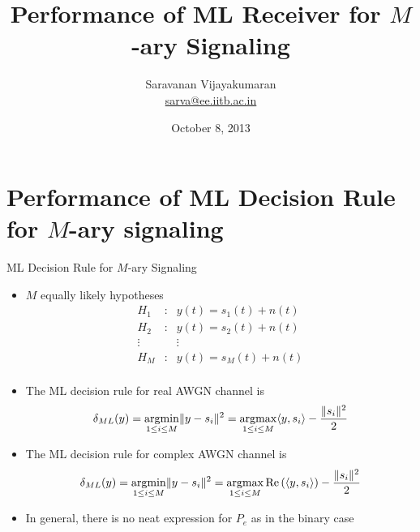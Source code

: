 \documentclass[t]{beamer}
\title[EE 703 DMT]{Performance of ML Receiver for $M$-ary Signaling}
\author[Saravanan V]
{
  Saravanan Vijayakumaran\\
  \href{mailto:sarva@ee.iitb.ac.in}{sarva@ee.iitb.ac.in}
}
\institute[IIT Bombay]
{
  Department of Electrical Engineering\\
  Indian Institute of Technology Bombay
}
\date{October 8, 2013}
\newcommand{\argmax}{\operatornamewithlimits{argmax}}
\newcommand{\argmin}{\operatornamewithlimits{argmin}}
\renewcommand\Re{\operatorname{Re}}
\begin{document}
\begin{frame}
  \titlepage
\end{frame}

\section{Performance of ML Decision Rule for $M$-ary signaling}
\begin{frame}{ML Decision Rule for $M$-ary Signaling}
  \footnotesize
  \begin{itemize}
    \item \pause $M$ equally likely hypotheses
      \begin{equation*}
        \begin{array}{ccc}
            H_1 & : & y(t) = s_1(t) + n(t) \\
            H_2 & : & y(t) = s_2(t) + n(t) \\
            \vdots &   &  \vdots          \\
            H_M & : & y(t) = s_M(t) + n(t) \\
        \end{array}
      \end{equation*}
    \item \pause The ML decision rule for real AWGN channel is
      \begin{eqnarray*}
        \delta_{ML}(y) = \argmin_{1 \leq i \leq M} \lVert y - s_i \rVert^2 = \argmax_{1 \leq i \leq M} \langle y, s_i \rangle - \frac{\lVert s_i \rVert^2}{2}
      \end{eqnarray*}
    \item \pause The ML decision rule for complex AWGN channel is
      \begin{eqnarray*}
        \delta_{ML}(y) = \argmin_{1 \leq i \leq M} \lVert y - s_i \rVert^2 = \argmax_{1 \leq i \leq M} \Re\left(\langle y, s_i \rangle\right) - \frac{\lVert s_i \rVert^2}{2}
      \end{eqnarray*}
    \item \pause In general, there is no neat expression for $P_e$ as in the binary case
  \end{itemize}
  \normalsize
\end{frame}
\end{document}

